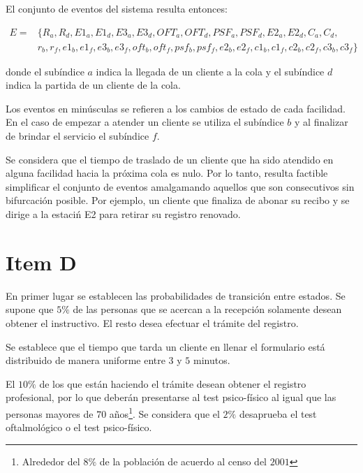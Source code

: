 \documentclass[a4paper,10pt]{article}
\begin{document}
El conjunto de eventos del sistema resulta entonces:

\begin{equation*}
\begin{split}
E = & \{R_a, R_d, E1_a, E1_d, E3_a, E3_d, OFT_a, OFT_d, PSF_a, PSF_d,
 E2_a, E2_d, C_a, C_d, \\
 & r_b, r_f, e1_b, e1_f, e3_b, e3_f, oft_b, oft_f,
 psf_b, psf_f, e2_b, e2_f, c1_b, c1_f, c2_b, c2_f, c3_b, c3_f \}
\end{split}
\end{equation*}


donde el sub\'indice $a$ indica la llegada de un cliente a la cola y el
sub\'indice $d$ indica la partida de un cliente de la cola.


Los eventos en min\'usculas se refieren a los cambios de estado de cada facilidad.
En el caso de empezar a atender un cliente se utiliza el sub\'indice $b$ y 
al finalizar de brindar el servicio el sub\'indice $f$.


Se considera que el tiempo de traslado de un cliente que ha sido atendido en
alguna facilidad hacia la pr\'oxima cola es nulo. Por lo tanto, resulta factible
simplificar el conjunto de eventos amalgamando aquellos que son
consecutivos sin bifurcaci\'{o}n posible. Por ejemplo, un cliente que finaliza
de abonar su recibo y se dirige a la estaci\'n E2 para retirar su registro
renovado.

\section*{Item D}

En primer lugar se establecen las probabilidades de transici\'on entre estados.
Se supone que $5\%$ de las personas que se acercan a la recepci\'on solamente
desean obtener el instructivo. El resto desea efectuar el tr\'amite del
registro.


Se establece que el tiempo que tarda un cliente en llenar el formulario est\'a
distribuido de manera uniforme entre $3$ y $5$ minutos.


El $10\%$ de los que est\'an haciendo el tr\'amite
desean obtener el registro profesional, por lo que deber\'an presentarse
al test psico-f\'isico al igual que las personas mayores de $70$ a\~nos\footnote{Alrededor del $8\%$ de la poblaci\'on de acuerdo al censo del $2001$}.
Se considera que el $2\%$ desaprueba el test oftalmol\'ogico
o el test psico-f\'isico. 
\end{document}
